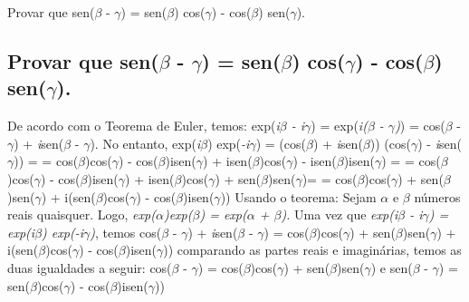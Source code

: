 \doublespacing
Provar que sen($\beta$ - $\gamma$) = sen($\beta$) cos($\gamma$) - cos($\beta$) sen($\gamma$).

\subsection{Provar que sen($\beta$ - $\gamma$) = sen($\beta$) cos($\gamma$) - cos($\beta$) sen($\gamma$).}
De acordo com o Teorema de Euler, temos: 
\newline
exp(\textit{i$\beta$ - i$\gamma$}) = exp(\textit{i($\beta$ - $\gamma$)}) = cos($\beta$ - $\gamma$) + \textit{i}sen($\beta$ - $\gamma$).
\newline
No entanto,
\newline
exp(\textit{i$\beta$}) exp(\textit{-i$\gamma$}) = (cos($\beta$) + \textit{i}sen($\beta$)) (cos($\gamma$) - \textit{i}sen($\gamma$)) = \newline
= cos($\beta$)cos($\gamma$) - cos($\beta$)isen($\gamma$) + isen($\beta$)cos($\gamma$) - isen($\beta$)isen($\gamma$) =\newline
= cos($\beta$)cos($\gamma$) - cos($\beta$)isen($\gamma$) + isen($\beta$)cos($\gamma$) + sen($\beta$)sen($\gamma$)= \newline
= cos($\beta$)cos($\gamma$) + sen($\beta$)sen($\gamma$) + i(sen($\beta$)cos($\gamma$) - cos($\beta$)isen($\gamma$))
\newline
Usando o teorema: Sejam $\alpha$ e $\beta$ números reais quaisquer. Logo, \textit{exp($\alpha$)exp($\beta$) = exp($\alpha$ + $\beta$).}
\newline
Uma vez que \textit{exp(\textit{i$\beta$ - i$\gamma$}) = exp(\textit{i$\beta$}) exp(\textit{-i$\gamma$})}, temos
\newline
cos($\beta$ - $\gamma$) + \textit{i}sen($\beta$ - $\gamma$) = cos($\beta$)cos($\gamma$) + sen($\beta$)sen($\gamma$) + i(sen($\beta$)cos($\gamma$) - cos($\beta$)isen($\gamma$))
\newline
comparando as partes reais e imaginárias, temos as duas igualdades a seguir:\newline
cos($\beta$ - $\gamma$) = cos($\beta$)cos($\gamma$) + sen($\beta$)sen($\gamma$) e
sen($\beta$ - $\gamma$) = sen($\beta$)cos($\gamma$) - cos($\beta$)isen($\gamma$))

